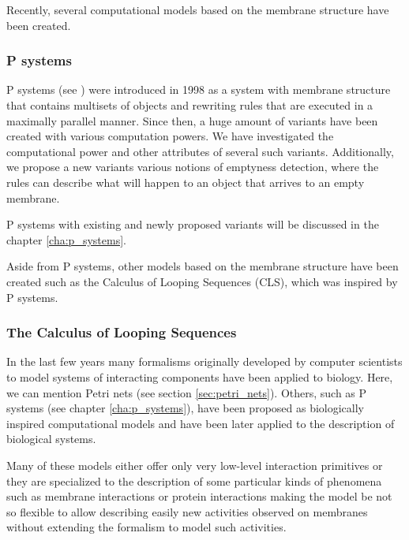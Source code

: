 
Recently, several computational models based on the membrane structure have been created.




\subsubsection{P systems} %
\label{subs:p_systems}

 P systems (see \cite{Paun98}) were introduced in 1998 as a system with membrane structure that contains multisets of objects and rewriting rules that are executed in a maximally parallel manner. Since then, a huge amount of variants have been created with various computation powers. We have investigated the computational power and other attributes of several such variants. Additionally, we propose a new variants various notions of emptyness detection, where the rules can describe what will happen to an object that arrives to an empty membrane.

P systems with existing and newly proposed variants will be discussed in the chapter \ref{cha:p_systems}.

Aside from P systems, other models based on the membrane structure have been created such as the Calculus of Looping Sequences (CLS), which was inspired by P systems.




\subsubsection{The Calculus of Looping Sequences} %
\label{subs:calculus_of_looping_sequences}

In the last few years many formalisms originally developed by computer scientists to model systems of interacting components have been applied to biology. Here, we can mention Petri nets (see section \ref{sec:petri_nets}). Others, such as P systems (see chapter \ref{cha:p_systems}), have been proposed as biologically inspired computational models and have been later applied to the description of biological systems.

Many of these models either offer only very low-level interaction primitives or they are specialized to the description of some particular kinds of phenomena such as membrane interactions or protein interactions making the model be not so flexible to allow describing easily new activities observed on membranes without extending the formalism to model such activities.

